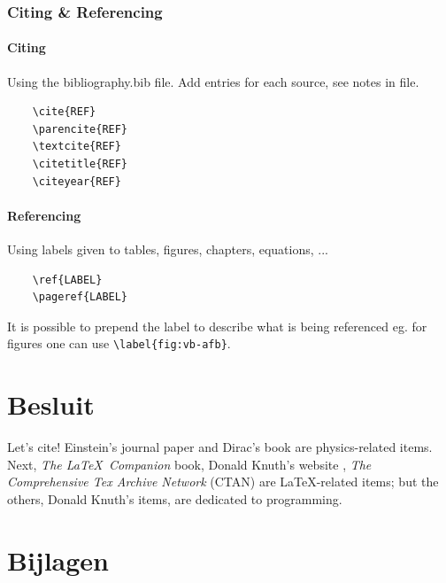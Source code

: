 \documentclass[a4paper, 11pt]{report}
\begin{document}
\subsection{Citing \& Referencing}
\subsubsection{Citing}
Using the bibliography.bib file. Add entries for each source, see notes in file.
\begin{verbatim}
	\cite{REF}
	\parencite{REF}
	\textcite{REF}
	\citetitle{REF}
	\citeyear{REF}
\end{verbatim}
\subsubsection{Referencing}
Using labels given to tables, figures, chapters, equations, ...
\begin{verbatim}
	\ref{LABEL}
	\pageref{LABEL}
\end{verbatim}
It is possible to prepend the label to describe what is being referenced eg. for figures one can use \verb|\label{fig:vb-afb}|.

\chapter*{Besluit} %
Let's cite! Einstein's 
journal paper \cite{einstein} and Dirac's book \cite{dirac} are 
physics-related items. Next, \textit{The \LaTeX\ Companion} book, Donald Knuth's website \cite{knuthwebsite},
\textit{The Comprehensive Tex Archive Network} (CTAN) are \LaTeX-related items; but the others, Donald Knuth's items, 
\cite{knuth-fa} are dedicated to programming. 

\printbibliography
{}

\chapter*{Bijlagen}

\begin{lstlisting}[frame=single,basicstyle=\ttfamily,breaklines=true]

	

\end{lstlisting}
\end{document}
